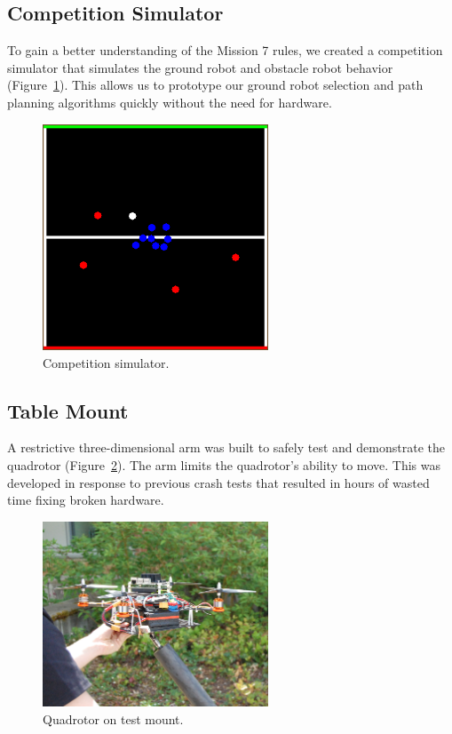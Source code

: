 \documentclass[12pt,letterpaper]{article} \usepackage[margin=1in]{geometry}
\begin{document}
\subsection*{Competition Simulator}

To gain a better understanding of the Mission 7 rules, we created a competition
simulator that simulates the ground robot and obstacle robot behavior
(Figure~\ref{fig:iarc_sim}). This
allows us to prototype our ground robot selection and path planning algorithms
quickly without the need for hardware.

\begin{figure}[!h]
	\centering
	\includegraphics[width=0.6\textwidth]{img/iarc_sim.png}
	\caption{Competition simulator.}
	\label{fig:iarc_sim}
\end{figure}

\subsection*{Table Mount}

A restrictive three-dimensional arm was built to safely test and demonstrate
the quadrotor (Figure~\ref{fig:quad_test_mount}). The arm limits the
quadrotor's ability to move. This was developed in response to previous crash
tests that resulted in hours of wasted time fixing broken hardware.

\begin{figure}[!h]
	\centering
	\includegraphics[width=0.6\textwidth]{img/quad_test_mount.jpg}
	\caption{Quadrotor on test mount.}
	\label{fig:quad_test_mount}
\end{figure}
\end{document}
